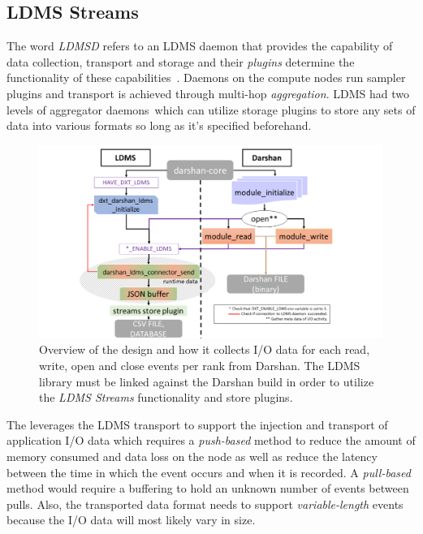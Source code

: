 \subsection{LDMS Streams}
The word \emph{LDMSD} refers to an LDMS daemon that provides the capability of data collection, transport and storage and their \emph{plugins} determine the functionality of these capabilities~\cite{ldmsgithubwiki}. Daemons on the compute nodes run sampler plugins and transport is achieved through multi-hop \emph{aggregation}. LDMS had two levels of aggregator daemons~\cite{ldmsgithubwiki}which can utilize storage plugins to store any sets of data into various formats so long as it's specified beforehand.

\begin{figure}
	\centering
	\includegraphics[trim={3.5cm 0 0 0},clip,
	width=1.15\linewidth]{figs/darshan-connector.pdf}
	\caption{Overview of the \connector{} design and how it collects I/O data for each read, write, open and close events per rank from Darshan. The LDMS library must be linked against the Darshan build in order to utilize the \emph{LDMS Streams} functionality and store plugins.}
	\label{f:Darshan Connector}
\end{figure}

The \Darshan{} leverages the LDMS transport to support the injection and transport of application I/O data which requires a \emph{push-based} method to reduce the amount of memory consumed and data loss on the node as well as reduce the latency between the time in which the event occurs and when it is recorded. A \emph{pull-based} method would require a buffering to hold an unknown number of events between pulls. Also, the transported data format needs to support \emph{variable-length} events because the I/O data will most likely vary in size. 

